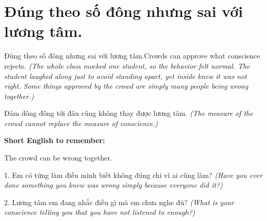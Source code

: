 \section{Đúng theo số đông nhưng sai với lương tâm.}
\begin{truyen}{Đúng theo số đông nhưng sai với lương tâm.}{Crowds can approve what conscience rejects.}
\textit{(The whole class mocked one student, so the behavior felt normal. The student laughed along just to avoid standing apart, yet inside knew it was not right. Some things approved by the crowd are simply many people being wrong together.)}
\end{truyen}
\begin{baihoc}
Đám đông đông tới đâu cũng không thay được lương tâm.
\textit{(The measure of the crowd cannot replace the measure of conscience.)}
\end{baihoc}
\begin{ghinhoanh}
\textbf{Short English to remember:}

The crowd can be wrong together.
\end{ghinhoanh}
\begin{tuhocnhanh}
1. Em có từng làm điều mình biết không đúng chỉ vì ai cũng làm? \textit{(Have you ever done something you knew was wrong simply because everyone did it?)}

2. Lương tâm em đang nhắc điều gì mà em chưa nghe đủ? \textit{(What is your conscience telling you that you have not listened to enough?)}
\end{tuhocnhanh}
\ngancach

